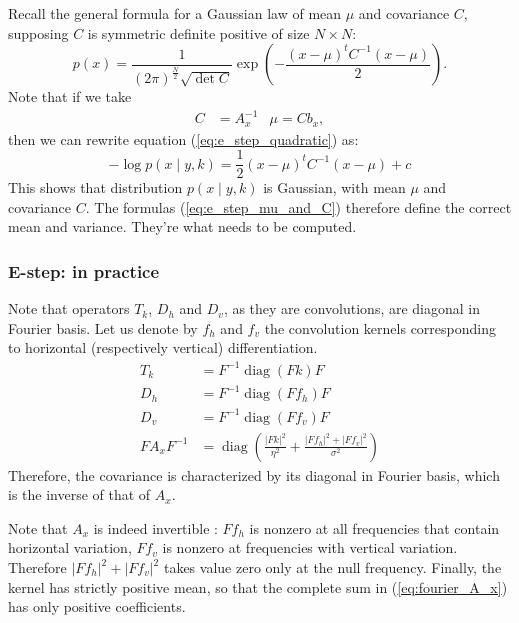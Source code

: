 \documentclass[english,a4paper]{article}
\theoremstyle{plain}
\theoremstyle{definition}
\theoremstyle{remark}
\DeclareMathOperator{\diag}{diag}
\begin{document}
Recall the general formula for a Gaussian law of mean $\mu$ and covariance $C$, supposing $C$ is symmetric definite positive of size $N\times N$:
\begin{equation}\label{eq:general_gaussian}
p(x) = \frac{1}{(2\pi)^{\frac{N}{2}} \sqrt{\det C}} \exp \left( -\frac{(x-\mu)^t C^{-1} (x-\mu)}{2} \right) .
\end{equation}
Note that if we take
\begin{align}\label{eq:e_step_mu_and_C}
C &= A_x^{-1}
&
\mu = C b_x ,
\end{align}
then we can rewrite equation (\ref{eq:e_step_quadratic}) as:
\begin{equation}\label{eq:e_step_gaussian}
-\log p(x \mid y,k) = \frac{1}{2} (x-\mu)^t C^{-1} (x-\mu) + c
\end{equation}
This shows that distribution $p(x \mid y,k)$ is Gaussian, with mean $\mu$ and covariance $C$.
The formulas (\ref{eq:e_step_mu_and_C}) therefore define the correct mean and variance. They're what needs to be computed.


\subsubsection{E-step: in practice}
Note that operators $T_k$, $D_h$ and $D_v$, as they are convolutions, are diagonal in Fourier basis. Let us denote by $f_h$ and $f_v$ the convolution kernels corresponding to horizontal (respectively vertical) differentiation.
\begin{align}
T_k &= F^{-1} \diag(Fk) F\\
D_h &= F^{-1} \diag(Ff_h) F \nonumber \\
D_v &= F^{-1} \diag(Ff_v) F \nonumber \\
\label{eq:fourier_A_x}
F A_x F^{-1} &= \diag \left( \frac{|Fk|^2}{\eta^2} + \frac{|Ff_h|^2 + |Ff_v|^2}{\sigma^2} \right)
\end{align}
Therefore, the covariance is characterized by its diagonal in Fourier basis, which is the inverse of that of $A_x$. 

Note that $A_x$ is indeed invertible : $Ff_h$ is nonzero at all frequencies that contain horizontal variation, $Ff_v$ is nonzero at frequencies with vertical variation. Therefore $|Ff_h|^2 + |Ff_v|^2$ takes value zero only at the null frequency. Finally, the kernel has strictly positive mean, so that the complete sum in (\ref{eq:fourier_A_x}) has only positive coefficients.
\end{document}
